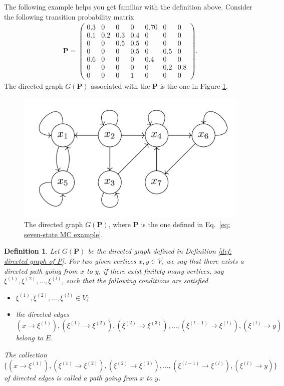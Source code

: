 \documentclass[11pt,letterpaper, leqno]{article}
\newtheorem{definition}{Definition}
\numberwithin{equation}{section}
\numberwithin{theorem}{section}
\numberwithin{lemma}{section}
\numberwithin{corollary}{section}
\numberwithin{definition}{section}
\numberwithin{proposition}{section}
\numberwithin{remark}{section}
\numberwithin{example}{section}
\begin{document}
The following example helps you get familiar with the definition above. Consider the following transition probability matrix
\begin{align}\label{eq: seven-state MC example}
\boldsymbol{P}=
    \begin{pmatrix}
0.3 & 0 & 0 & 0 & 0.7 0 & 0 & 0 \\
0.1 & 0.2 & 0.3 & 0.4 & 0 & 0 & 0 \\ 
0 & 0 & 0.5 & 0.5 & 0 & 0  & 0 \\
0 & 0  & 0 &0.5 & 0 & 0.5 & 0 \\
0.6 & 0  & 0  & 0 & 0.4 & 0 & 0 \\
0 & 0  & 0  & 0  & 0 & 0.2 & 0.8 \\
0 & 0  & 0 & 1 & 0  & 0  & 0 
\end{pmatrix}.
\end{align}
The directed graph $G(\boldsymbol{P})$ associated with the $\boldsymbol{P}$ is the one in Figure \ref{fig:my_label}.
\begin{figure}[H]
    \centering
    \includegraphics[scale=0.2]{Screen Shot 2022-11-04 at 3.01.39 PM.png}
    \caption{The directed graph $G(\boldsymbol{P})$, where $\boldsymbol{P}$ is the one defined in Eq.~\eqref{eq: seven-state MC example}.}
    \label{fig:my_label}
\end{figure}

\begin{definition}
Let $G(\boldsymbol{P})$ be the directed graph defined in Definition \ref{def: directed graph of P}. For two given vertices $x, y\in V$, we say that there exists a directed path going from $x$ to $y$, if there exist finitely many vertices, say $\xi^{(1)}, \xi^{(2)}, \ldots, \xi^{(l)}$, such that the following conditions are satisfied
\begin{itemize}
    \item $\xi^{(1)}, \xi^{(2)}, \ldots, \xi^{(l)} \in V$;
    \item the directed edges $(x\rightarrow \xi^{(1)}), (\xi^{(1)}\rightarrow \xi^{(2)}), (\xi^{(2)}\rightarrow \xi^{(3)}), \ldots, (\xi^{(l-1)}\rightarrow \xi^{(l)}), (\xi^{(l)}\rightarrow y)$ belong to $E$.
\end{itemize}
The collection $\{(x\rightarrow \xi^{(1)}), (\xi^{(1)}\rightarrow \xi^{(2)}), (\xi^{(2)}\rightarrow \xi^{(3)}), \ldots, (\xi^{(l-1)}\rightarrow \xi^{(l)}), (\xi^{(l)}\rightarrow y)\}$ of directed edges is called a path going from $x$ to $y$.
\end{definition}
\end{document}

